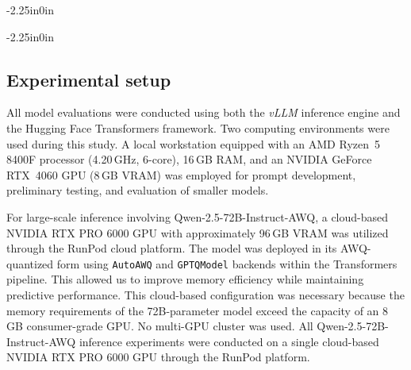 \documentclass[10pt,letterpaper]{article}
\begin{document}
\begin{adjustwidth}{-2.25in}{0in}
\begin{minipage}{0.95\linewidth}
\centering
\label{fig:hate_few_prompt}
\end{minipage}
\end{adjustwidth}

\begin{adjustwidth}{-2.25in}{0in}
\begin{minipage}{0.95\linewidth}
\centering
\label{fig:fake_few_prompt}
\end{minipage}
\end{adjustwidth}

\subsection*{Experimental setup}
\label{sec:experiment}



All model evaluations were conducted using both the \textit{vLLM} inference engine and the Hugging Face Transformers framework. Two computing environments were used during this study. A local workstation equipped with an AMD Ryzen~5 8400F processor (4.20\,GHz, 6-core), 16\,GB RAM, and an NVIDIA GeForce RTX~4060 GPU (8\,GB VRAM) was employed for prompt development, preliminary testing, and evaluation of smaller models.



For large-scale inference involving Qwen-2.5-72B-Instruct-AWQ, a cloud-based NVIDIA RTX PRO 6000 GPU with approximately 96\,GB VRAM was utilized through the RunPod cloud platform. The model was deployed in its AWQ-quantized form using \texttt{AutoAWQ} and \texttt{GPTQModel} backends within the Transformers pipeline. This allowed us to improve memory efficiency while maintaining predictive performance. This cloud-based configuration was necessary because the memory requirements of the 72B-parameter model exceed the capacity of an 8\,GB consumer-grade GPU. No multi-GPU cluster was used. All Qwen-2.5-72B-Instruct-AWQ inference experiments were conducted on a single cloud-based NVIDIA RTX PRO 6000 GPU through the RunPod platform.
\end{document}
